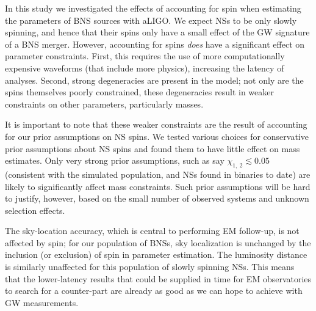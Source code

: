 In this study we investigated the effects of accounting for spin when estimating the parameters of BNS sources with aLIGO. We expect NSs to be only slowly spinning, and hence that their spins only have a small effect of the GW signature of a BNS merger. However, accounting for spins \emph{does} have a significant effect on parameter constraints. First, this requires the use of more computationally expensive waveforms (that include more physics), increasing the latency of analyses. Second, strong degeneracies are present in the model; not only are the spins themselves poorly constrained, these degeneracies result in weaker constraints on other parameters, particularly masses.

It is important to note that these weaker constraints are the result of accounting for our prior assumptions on NS spins.  We tested various choices for conservative prior assumptions about NS spins and found them to have little effect on mass estimates.  Only very strong prior assumptions, such as say $\chi_{1,~2}\lesssim 0.05$ (consistent with the simulated population, and NSs found in binaries to date) are likely to significantly affect mass constraints.  Such prior assumptions will be hard to justify, however, based on the small number of observed systems and unknown selection effects. 

The sky-location accuracy, which is central to performing EM follow-up, is not affected by spin; for our population of BNSs, sky localization is unchanged by the inclusion (or exclusion) of spin in parameter estimation. The luminosity distance is similarly unaffected for this population of slowly spinning NSs. This means that the lower-latency results that could be supplied in time for EM observatories to search for a counter-part are already as good as we can hope to achieve with GW measurements.
  
  
  
  